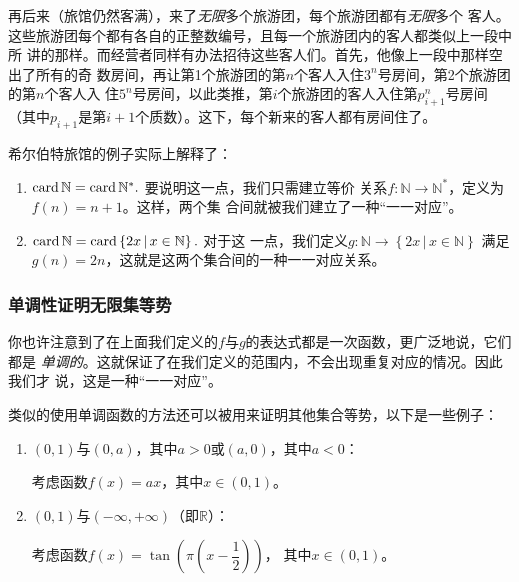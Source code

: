 再后来（旅馆仍然客满），来了\emph{无限}多个旅游团，每个旅游团都有\emph{无限}多个
客人。这些旅游团每个都有各自的正整数编号，且每一个旅游团内的客人都类似上一段中所
讲的那样。而经营者同样有办法招待这些客人们。首先，他像上一段中那样空出了所有的奇
数房间，再让第1个旅游团的第$n$个客人入住$3^n$号房间，第2个旅游团的第$n$个客人入
住$5^n$号房间，以此类推，第$i$个旅游团的客人入住第$p_{i+1}^n$号房间（其中$p_{i+1}
$是第$i+1$个质数）。这下，每个新来的客人都有房间住了。

\vspace{3ex}

希尔伯特旅馆的例子实际上解释了：
\begin{enumerate}
    \item $\operatorname{card}\mathbb{N}=\operatorname{card}\mathbb{N}^\ast.$ 要说明这一点，我们只需建立等价
        关系$f: \mathbb{N} \to \mathbb{N}^\ast$，定义为$f(n)=n+1$。这样，两个集
        合间就被我们建立了一种“一一对应”。

    \item $\operatorname{card}\mathbb{N}=\operatorname{card}\left\{ 2x\,|\,x\in\mathbb{N} \right\}.$ 对于这
        一点，我们定义$g: \mathbb{N} \to \left\{ 2x\,|\,x\in\mathbb{N} \right\}$
        满足$g(n)=2n$，这就是这两个集合间的一种一一对应关系。
\end{enumerate}

\subsubsection{单调性证明无限集等势}

你也许注意到了在上面我们定义的$f$与$g$的表达式都是一次函数，更广泛地说，它们都是
\emph{单调的}。这就保证了在我们定义的范围内，不会出现重复对应的情况。因此我们才
说，这是一种“一一对应”。

类似的使用单调函数的方法还可以被用来证明其他集合等势，以下是一些例子：

\begin{enumerate}
    \item $\left( 0,1 \right) $与$\left( 0,a \right) $，其中$a > 0$或$\left( a,0 
        \right) $，其中$a < 0$：\label{item:01and0a}

        考虑函数$f(x)=ax$，其中$x\in \left( 0,1 \right)$。

    \item $\left( 0,1 \right) $与$\left( -\infty,+\infty \right) $（即$\mathbb{R}
        $）：

        考虑函数$f(x)=\tan \left( \pi \left( x - \dfrac{1}{2} \right)  \right) $，
        其中$x\in \left( 0,1 \right) $。
\end{enumerate}

